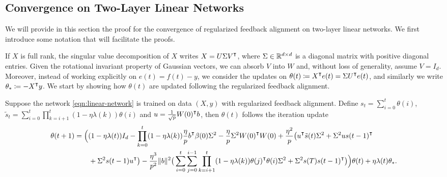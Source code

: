 \subsection{Convergence on Two-Layer Linear Networks}

We will provide in this section the proof for the convergence of regularized feedback alignment on two-layer linear networks. We first introduce some notation that will facilitate the proofs.

If $X$ is full rank, the singular value decomposition of $X$ writes $X = U\Sigma V\transpose$, where $\Sigma \in \mathbb{R}^{d\times d}$ is a diagonal matrix with positive diagonal entries. Given the rotational invariant property of Gaussian vectors, we can absorb $V$ into $W$ and, without loss of generality, assume $V = I_d$. 
Moreover, instead of working explicitly on $e(t) = f(t) - y$, we consider the updates on $\theta(t) \defeq X\transpose e(t) = \Sigma U\transpose e(t)$, and similarly we write $\theta_\ast \defeq -X\transpose y$. We start by showing how $\theta(t)$ are updated following the regularized feedback alignment.

\begin{lemma}\label{lem:theta-updates}
    Suppose the network \eqref{eqn:linear-network} is trained on data $(X,y)$ with regularized feedback alignment. Define $s_{t} = \sum_{i=0}^{t} \theta(i)$, $\tilde s_{t} = \sum_{i=0}^{t} \prod_{k=i+1}^t (1-\eta\lambda(k))\theta(i)$ and $u = \frac{1}{\sqrt{p}} W(0)\transpose b$, then $\theta(t)$ follows the iteration update
    \begin{align}\label{eqn:theta-tlam-ordinary}
        \begin{split}
            \theta(t+1) & = \Big((1-\eta\lambda(t))I_d - \prod_{k=0}^t(1-\eta\lambda(k))\frac{\eta}{p}b\transpose\beta(0) \Sigma^2 - \frac{\eta}{p}\Sigma^2 W(0)\transpose W(0) + \frac{\eta^2}{p}\big(u\transpose \tilde{s}(t) \Sigma^2 + \Sigma^2 u s(t-1)\transpose \\
            & \qquad + \Sigma^2 s(t-1)u\transpose\big) - \frac{\eta^3}{p^2}\|b\|^2\big(\sum_{i=0}^t\sum_{j=0}^{i-1} \prod_{k=i+1}^t(1-\eta\lambda(k))\theta(j)\transpose \theta(i) \Sigma^2 + \Sigma^2 s(T)s(t-1)\transpose \big) \Big)\theta(t) + \eta\lambda(t) \theta_\ast.
        \end{split}
    \end{align}
\end{lemma}

